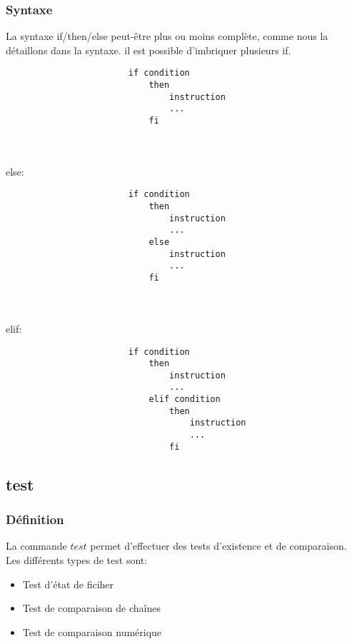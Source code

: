 			    \subsubsection{Syntaxe}
					La syntaxe if/then/else peut-être plus ou moins complète, comme nous la détaillons dans la syntaxe. il est possible d'imbriquer plusieurs if.
					\begin{verbatim}	
						if condition
						    then 
						        instruction
						        ...
					        fi
					\end{verbatim}					\\ \\
					else: 
					\begin{verbatim}	
						if condition
						    then 
						        instruction
						        ...
						    else
						        instruction
						        ...
						    fi
					\end{verbatim}					 \\ \\
					elif: 
					\begin{verbatim}	
						if condition
						    then 
					  	        instruction
						        ...
						    elif condition
						        then
						            instruction
						            ...
					  	        fi
					\end{verbatim}					
		\subsection{test}
			\subsubsection{Définition}
				La commande $test$ permet d'effectuer des tests d'existence et de comparaison.\\
				Les différents types de test sont:
				\begin{itemize}
					\item Test d'état de ficiher
					\item Test de comparaison de chaînes
					\item Test de comparaison numérique
				\end{itemize}
